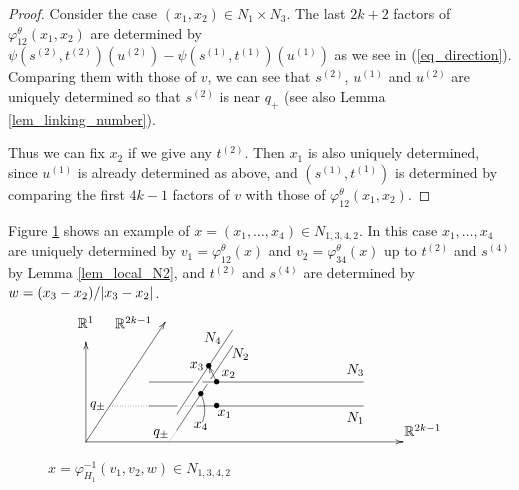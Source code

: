 \begin{proof}
Consider the case $(x_1 ,x_2 ) \in N_1 \times N_3$.
The last $2k+2$ factors of $\varphi^{\theta}_{12}(x_1 ,x_2 )$ are determined by
$\psi (s^{(2)}, t^{(2)})(u^{(2)})-\psi (s^{(1)}, t^{(1)})(u^{(1)})$ as we see in (\ref{eq_direction}).
Comparing them with those of $v$, we can see that $s^{(2)}$, $u^{(1)}$ and $u^{(2)}$ are uniquely determined
so that $s^{(2)}$ is near $q_+$ (see also Lemma \ref{lem_linking_number}).


Thus we can fix $x_2$ if we give any $t^{(2)}$.
Then $x_1$ is also uniquely determined, since $u^{(1)}$ is already determined as above, and $(s^{(1)},t^{(1)})$ is
determined by comparing the first $4k-1$ factors of $v$ with those of $\varphi^{\theta}_{12}(x_1 ,x_2 )$.
\end{proof}


Figure \ref{fig_link} shows an example of $x=(x_1 ,\dots ,x_4) \in N_{1,3,4,2}$.
In this case $x_1,\dots ,x_4$ are uniquely determined by $v_1 =\varphi^{\theta}_{12}(x)$ and
$v_2 =\varphi^{\theta}_{34}(x)$ up to $t^{(2)}$ and $s^{(4)}$ by Lemma \ref{lem_local_N2}, and $t^{(2)}$ and $s^{(4)}$
are determined by $w=(x_3 -x_2 )/\lvert {x_3 -x_2} \rvert$.
\begin{figure}[htb]%
\[
 \begin{xy}
 {\ar (0,0);(80,0)},{\ar (0,0);(20,30)},{\ar (0,0);(0,25)}, (0,30)*{\R^1},(12,30)*{\R^{2k-1}},(85,3)*{\R^{2k-1}},
 {\ar@{-}(23,7);(37,28)},(32,26)*{N_4},
 {\ar@{-}(16,15);(27,15)},{\ar@{-}(29.5,15);(70,15)},(68,18)*{N_3},
 {\ar@{-}(23,3);(30.6,14.4)},{\ar@{-}(31.6,15.9);(37,24)},(39,22)*{N_2},
 {\ar@{-}(16,9);(23,9)},{\ar@{.}(25,9);(27,9)},{\ar@{-}(28,9);(70,9)},(68,6)*{N_1},
 (31,19)*{\bullet},(33,15)*{\bullet},{\ar (33,15);(31,19)},(28,19)*{x_3}, (36,17)*{x_2},
 (29,12)*{\bullet},(33,9)*{\bullet}, (35,7)*{x_1},
 (29,4)*{x_4}="A", {\ar@{-}@/_1mm/"A";(29,12)},
 {\ar@{.}(6,9);(16,9)}, (3,9)*{q_{\pm}},
 {\ar@{.}(21,0);(23,3)}, (19,2)*{q_{\pm}},
 \end{xy}
\]
\caption{$x=\varphi^{-1}_{H_1}(v_1 ,v_2 ,w)\in N_{1,3,4,2}$}\label{fig_link}
\end{figure}


